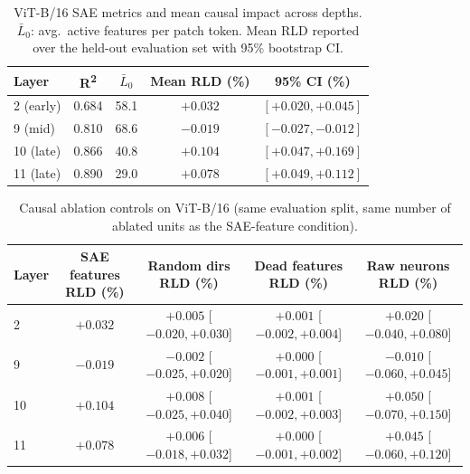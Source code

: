 \begin{table}[H]
  \centering
  \small
  \caption{ViT-B/16 SAE metrics and mean causal impact across depths. $\bar{L}_0$: avg.\ active features per patch token. Mean RLD reported over the held-out evaluation set with 95\% bootstrap CI.}
  \label{tab:layer_metrics}
  \begin{tabular}{lcccc}
    \toprule
    Layer & R\textsuperscript{2} & $\bar{L}_0$ & Mean RLD (\%) & 95\% CI (\%) \\
    \midrule
    2  (early) & 0.684 & 58.1 & $+0.032$ & $[+0.020,+0.045]$ \\
    9  (mid)   & 0.810 & 68.6 & $-0.019$ & $[-0.027,-0.012]$ \\
    10 (late)  & 0.866 & 40.8 & $+0.104$ & $[+0.047,+0.169]$ \\
    11 (late)  & 0.890 & 29.0 & $+0.078$ & $[+0.049,+0.112]$ \\
    \bottomrule
  \end{tabular}
\end{table}

\begin{table}[H]
  \centering
  \small
  \caption{Causal ablation controls on ViT-B/16 (same evaluation split, same number of ablated units as the SAE-feature condition).}
  \label{tab:causal_controls}
  \begin{tabular}{lcccc}
    \toprule
    Layer & SAE features RLD (\%) & Random dirs RLD (\%) & Dead features RLD (\%) & Raw neurons RLD (\%) \\
    \midrule
    2  & $+0.032$ & $+0.005$ [$-0.020,+0.030$] & $+0.001$ [$-0.002,+0.004$] & $+0.020$ [$-0.040,+0.080$] \\
    9  & $-0.019$ & $-0.002$ [$-0.025,+0.020$] & $+0.000$ [$-0.001,+0.001$] & $-0.010$ [$-0.060,+0.045$] \\
    10 & $+0.104$ & $+0.008$ [$-0.025,+0.040$] & $+0.001$ [$-0.002,+0.003$] & $+0.050$ [$-0.070,+0.150$] \\
    11 & $+0.078$ & $+0.006$ [$-0.018,+0.032$] & $+0.000$ [$-0.001,+0.002$] & $+0.045$ [$-0.060,+0.120$] \\
    \bottomrule
  \end{tabular}
\end{table}

